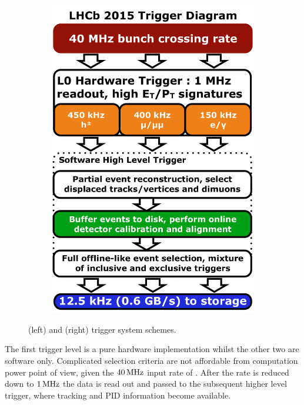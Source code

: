 \begin{figure}[t!]
\begin{subfigure}{0.5\textwidth}
    \includegraphics[width=\textwidth]{Figures/Chapter2/LHCb_Trigger_RunII_May2015}
    \caption{}
    \label{det_run_two_trigger}
  \end{subfigure}
  \caption{ \runone (left) and \runtwo (right) trigger system schemes.}
  \label{det_trigger_scheams}
\end{figure}

The first trigger level is a pure hardware implementation whilst the other two are software only.
Complicated selection criteria are not affordable from computation power point of view, given the
$40{\rm \,MHz}$ input rate of \lzero. After the rate is reduced down to $1{\rm \,MHz}$ the data is read out and
passed to the subsequent higher level trigger, where tracking and PID information become available.

